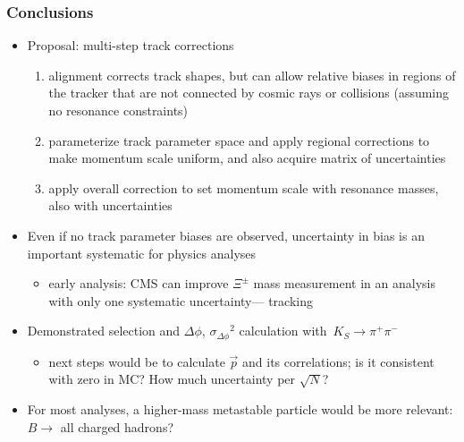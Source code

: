 \documentclass[compress]{beamer}
\begin{document}
\begin{frame}
\frametitle{Conclusions}
\begin{itemize}
\item Proposal: multi-step track corrections
\begin{enumerate}
\item alignment corrects track shapes, but can allow relative biases
  in regions of the tracker that are not connected by cosmic rays or
  collisions (assuming no resonance constraints)
\item parameterize track parameter space and apply regional
  corrections to make momentum scale uniform, and also acquire matrix
  of uncertainties
\item apply overall correction to set momentum scale with resonance
  masses, also with uncertainties
\end{enumerate}

\item Even if no track parameter biases are observed, uncertainty in
  bias is an important systematic for physics analyses
\begin{itemize}
\item early analysis: CMS can improve $\Xi^\pm$ mass measurement in an
  analysis with only one systematic uncertainty--- tracking
\end{itemize}

\item Demonstrated selection and $\Delta \phi$, ${\sigma_{\Delta
    \phi}}^2$ calculation \mbox{with $K_S \to \pi^+\pi^-$\hspace{-1 cm}}
\begin{itemize}
\item next steps would be to calculate $\vec{p}$ and its correlations;
  is it consistent with zero in MC?  How much uncertainty per $\sqrt{N}$?
\end{itemize}

\item For most analyses, a higher-mass metastable particle would be
  more relevant: $B \to$ all charged hadrons?

\end{itemize}
\label{numpages}
\end{frame}
\end{document}
